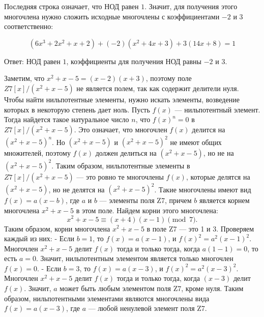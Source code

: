 \documentclass{article}
\begin{document}
Последняя строка означает, что НОД равен $1$. Значит, для получения этого многочлена нужно сложить исходные многочлены с коэффициентами $-2$ и $3$ соответственно:

$$(6x^3 + 2x^2 + x + 2) + (-2)(x^2 + 4x + 3) + 3(14x + 8) = 1$$

Ответ: НОД равен $1$, коэффициенты для получения НОД равны $-2$ и $3$.

\newpage 

Заметим, что $x^2+x-5=(x-2)(x+3)$, поэтому поле $Z7[x]/(x^2+x-5)$ не является полем, так как содержит делители нуля. Чтобы найти нильпотентные элементы, нужно искать элементы, возведение которых в некоторую степень дает ноль.
Пусть $f(x)$ — нильпотентный элемент. Тогда найдется такое натуральное число $n$, что $f(x)^n=0$ в $Z7[x]/(x^2+x-5)$. Это означает, что многочлен $f(x)$ делится на $(x^2+x-5)^n$. Но $(x^2+x-5)$ и $(x^2+x-5)^2$ не имеют общих множителей, поэтому $f(x)$ должен делиться на $(x^2+x-5)$, но не на $(x^2+x-5)^2$.
Таким образом, нильпотентные элементы в $Z7[x]/(x^2+x-5)$ — это ровно те многочлены $f(x)$, которые делятся на $(x^2+x-5)$, но не делятся на $(x^2+x-5)^2$. Такие многочлены имеют вид $f(x)=a(x-b)$, где $a$ и $b$ — элементы поля Z7, причем $b$ является корнем многочлена $x^2+x-5$ в этом поле. Найдем корни этого многочлена:
$$x^2+x-5 \equiv (x+4)(x-1) \pmod{7}.$$
Таким образом, корни многочлена $x^2+x-5$ в поле Z7 — это 1 и 3. Проверяем каждый из них:
- Если $b=1$, то $f(x)=a(x-1)$, и $f(x)^2=a^2(x-1)^2$. Многочлен $x^2+x-5$ делит $f(x)$ тогда и только тогда, когда $a(1-1)=0$, то есть $a=0$. Значит, нильпотентным элементом является только многочлен $f(x)=0$.
- Если $b=3$, то $f(x)=a(x-3)$, и $f(x)^2=a^2(x-3)^2$. Многочлен $x^2+x-5$ делит $f(x)$ тогда и только тогда, когда $(x-3)$ делит $f(x)$. Значит, $a$ может быть любым элементом поля Z7, кроме нуля. Таким образом, нильпотентными элементами являются многочлены вида $f(x)=a(x-3)$, где $a$ — любой ненулевой элемент поля Z7.
\end{document}
